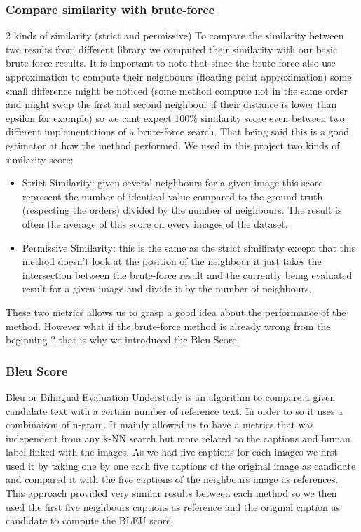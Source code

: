 \documentclass[a4paper]{article}
\begin{document}
	\subsubsection{Compare similarity with brute-force}
		2 kinds of similarity (strict and permissive)
		To compare the similarity between two results from different library we computed their similarity with our basic brute-force results. It is important to note that since the brute-force also use approximation to compute their neighbours (floating point approximation) some small difference might be noticed (some method compute not in the same order and might swap the first and second neighbour if their distance is lower than epsilon for example) so we cant expect 100\% similarity score even between two different implementations of a brute-force search. That being said this is a good estimator at how the method performed. We used in this project two kinds of similarity score:
		\begin{itemize}
			\item Strict Similarity: given several neighbours for a given image this score represent the number of identical value compared to the ground truth (respecting the orders) divided by the number of neighbours. The result is often the average of this score on every images of the dataset.
			\item Permissive Similarity: this is the same as the strict similiraty except that this method doesn't look at the position of the neighbour it just takes the intersection between the brute-force result and the currently being evaluated result for a given image and divide it by the number of neighbours.
		\end{itemize}
		These two metrics allows us to grasp a good idea about the performance of the method. However what if the brute-force method is already wrong from the beginning ? that is why we introduced the Bleu Score.
	\subsubsection{Bleu Score}
		Bleu or Bilingual Evaluation Understudy is an algorithm to compare a given candidate text with a certain number of reference text. In order to so it uses a combinaison of n-gram. It mainly allowed us to have a metrics that was independent from any k-NN search but more related to the captions and human label linked with the images. As we had five captions for each images we first used it by taking one by one each five captions of the original image as candidate and compared it with the five captions of the neighbours image as references. This approach provided very similar results between each method so we then used the first five neighbours captions as reference and the original caption as candidate to compute the BLEU score.
		
\end{document}
